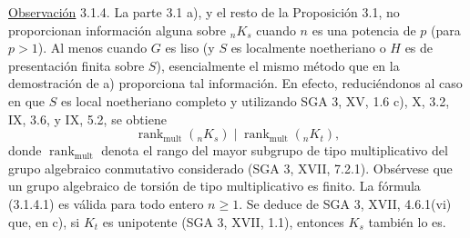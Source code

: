 \medskip
\noindent
\underline{Observación} 3.1.4. La parte 3.1 a), y el resto de la
Proposición 3.1, no proporcionan información alguna sobre ${}_nK_s$
cuando $n$ es una potencia de $p$ (para $p>1$). Al menos cuando $G$ es
liso (y $S$ es localmente noetheriano o $H$ es de presentación finita
sobre $S$), esencialmente el mismo método que en la demostración de a)
proporciona tal información. En efecto, reduciéndonos al caso en que
$S$ es local noetheriano completo y utilizando SGA 3, XV, 1.6 c), X,
3.2, IX, 3.6, y IX, 5.2, se obtiene
\begin{equation}\tag{3.1.4.1}
 \operatorname{rank}_{\mathrm{mult}}({}_nK_s)
 \mid
 \operatorname{rank}_{\mathrm{mult}}({}_nK_t),
\end{equation}
donde $\operatorname{rank}_{\mathrm{mult}}$ denota el rango del mayor
subgrupo de tipo multiplicativo del grupo algebraico conmutativo
considerado (SGA 3, XVII, 7.2.1). Obsérvese que un grupo algebraico de
torsión de tipo multiplicativo es finito. La fórmula (3.1.4.1) es
válida para todo entero $n\geq1$. Se deduce de SGA 3, XVII, 4.6.1(vi)
que, en c), si $K_t$ es unipotente (SGA 3, XVII, 1.1), entonces $K_s$
también lo es.
